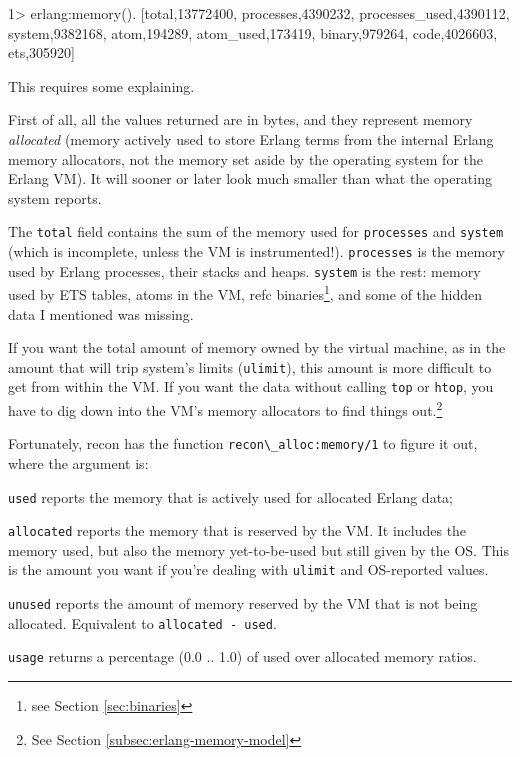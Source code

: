 \documentclass[11pt, oneside]{book}   	%
\newcommand{\app}[1]{\Verb`#1`}
\newcommand{\function}[1]{\Verb`#1`}
\newcommand{\expression}[1]{\Verb`#1`}
\begin{document}
\begin{VerbatimEshell}
1> erlang:memory().
[{total,13772400},
 {processes,4390232},
 {processes_used,4390112},
 {system,9382168},
 {atom,194289},
 {atom_used,173419},
 {binary,979264},
 {code,4026603},
 {ets,305920}]
\end{VerbatimEshell}

This requires some explaining.

First of all, all the values returned are in bytes, and they represent memory \emph{allocated} (memory actively used to store Erlang terms from the internal Erlang memory allocators, not the memory set aside by the operating system for the Erlang VM). It will sooner or later look much smaller than what the operating system reports.

The \expression{total} field contains the sum of the memory used for \expression{processes} and \expression{system} (which is incomplete, unless the VM is instrumented!). \expression{processes} is the memory used by Erlang processes, their stacks and heaps. \expression{system} is the rest: memory used by ETS tables, atoms in the VM, refc binaries\footnote{see Section \ref{sec:binaries}}, and some of the hidden data I mentioned was missing.

If you want the total amount of memory owned by the virtual machine, as in the amount that will trip system's limits (\app{ulimit}), this amount is more difficult to get from within the VM. If you want the data without calling \app{top} or \app{htop}, you have to dig down into the VM's memory allocators to find things out.\footnote{See Section \ref{subsec:erlang-memory-model}}

Fortunately, recon has the function \function{recon\_alloc:memory/1} to figure it out, where the argument is:

\begin{itemize*}
	\item \expression{used} reports the memory that is actively used for allocated Erlang data;
   	\item \expression{allocated} reports the memory that is reserved by the VM. It includes the memory used, but also the memory yet-to-be-used but still given by the OS. This is the amount you want if you're dealing with \app{ulimit} and OS-reported values.
	\item \expression{unused} reports the amount of memory reserved by the VM that is not being allocated. Equivalent to \expression{allocated - used}.
	\item \expression{usage} returns a percentage (0.0 .. 1.0) of used over allocated memory ratios.
\end{itemize*}
\end{document}
